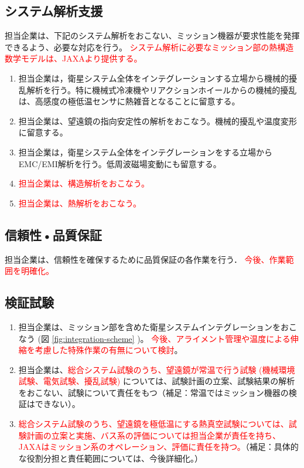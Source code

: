 \documentclass[xelatex,ja=standard]{bxjsarticle}
\newcommand{\red}[1]{\textcolor{red}{#1}}
\begin{document}
\subsection{システム解析支援}

担当企業は、下記のシステム解析をおこない、ミッション機器が要求性能を発揮できるよう、必要な対応を行う。
\red{システム解析に必要なミッション部の熱構造数学モデルは、JAXAより提供する。}
%
\begin{enumerate}
    \item 担当企業は，衛星システム全体をインテグレーションする立場から機械的擾乱解析を行う。特に機械式冷凍機やリアクションホイールからの機械的擾乱は、高感度の極低温センサに熱雑音となることに留意する。
　 \item 担当企業は、望遠鏡の指向安定性の解析をおこなう。機械的擾乱や温度変形に留意する。
　　\item 担当企業は，衛星システム全体をインテグレーションをする立場からEMC/EMI解析を行う。低周波磁場変動にも留意する。
　　\item \red{担当企業は、構造解析をおこなう。}
　　\item \red{担当企業は、熱解析をおこなう。}
\end{enumerate}	

\subsection{信頼性•品質保証}

担当企業は、信頼性を確保するために品質保証の各作業を行う．
\red{今後、作業範囲を明確化。}

\subsection{検証試験}

\begin{enumerate}
\item 担当企業は、ミッション部を含めた衛星システムインテグレーションをおこなう (図 \ref{fig:integration-scheme} )。
\red{今後、アライメント管理や温度による伸縮を考慮した特殊作業の有無について検討}。
\item 担当企業は、\red{総合システム試験のうち、望遠鏡が常温で行う試験 (機械環境試験、電気試験、擾乱試験)} については、試験計画の立案、試験結果の解析をおこない、試験について責任をもつ（補足：常温ではミッション機器の検証はできない）。
\item \red{総合システム試験のうち、望遠鏡を極低温にする熱真空試験については、試験計画の立案と実施、バス系の評価については担当企業が責任を持ち、JAXAはミッション系のオペレーション、評価に責任を持つ。}（補足：具体的な役割分担と責任範囲については、今後詳細化。）
\end{enumerate}
\end{document}
